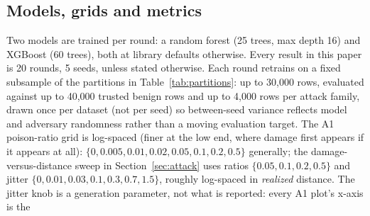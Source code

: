 \subsection{Models, grids and metrics}
Two models are trained per round: a random forest (25 trees, max depth 16) and XGBoost (60
trees), both at library defaults otherwise. Every result in this paper is 20 rounds, 5 seeds,
unless stated otherwise.
Each round retrains on a fixed subsample of the partitions in Table~\ref{tab:partitions}: up to
30{,}000  rows, evaluated against up to 40{,}000 trusted benign rows and up
to 4{,}000  rows per attack family, drawn once per dataset (not per seed)
so between-seed variance reflects model and adversary randomness rather than a moving
evaluation target.
The A1 poison-ratio grid is log-spaced (finer at the low end, where damage first appears if it
appears at all): $\{0, 0.005, 0.01, 0.02, 0.05, 0.1, 0.2, 0.5\}$ generally; the
damage-versus-distance sweep in Section~\ref{sec:attack} uses ratios
$\{0.05, 0.1, 0.2, 0.5\}$ and jitter $\{0, 0.01, 0.03, 0.1, 0.3, 0.7, 1.5\}$, roughly log-spaced
in \emph{realized} distance.
The jitter knob is a generation parameter, not what is reported: every A1 plot's x-axis is the
